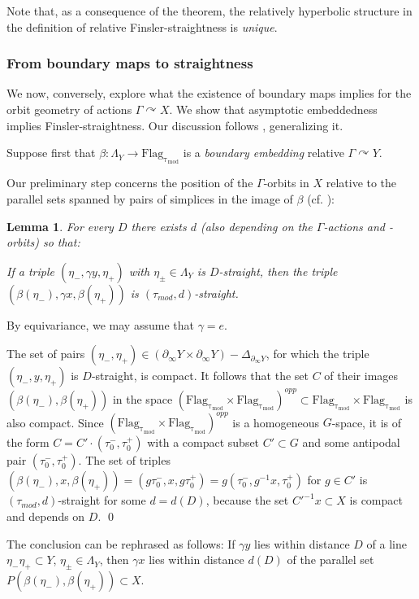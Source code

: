 \documentclass[12pt]{article}
\theoremstyle{boldplain}
\newtheorem{lem}[equation]{Lemma}
\theoremstyle{bolddefinition}
\numberwithin{equation}{section}
\def\ga{\gamma}
\def\Ga{\Gamma}
\def\De{\Delta}
\def\La{\Lambda}
\def\acts{\curvearrowright}
\def\Flagt{\operatorname{Flag_{\tau_{mod}}}}
\def\geo{\partial_{\infty}}
\def\LaY{\Lambda_Y}
\def\taumod{\tau_{mod}}
\begin{document}
\medskip
Note that, as a consequence of the theorem, 
the relatively hyperbolic structure in the definition of relative Finsler-straightness is {\em unique}.



\subsubsection{From boundary maps to straightness}
\label{sec:main}

We now, conversely, 
explore what the existence of boundary maps implies for the orbit geometry of actions $\Ga\acts X$.
We show that asymptotic embeddedness implies Finsler-straightness. 
Our discussion follows \cite[\S 5.3]{anolec}, generalizing it.

Suppose first that $\beta:\LaY\to\Flagt$ is a {\em boundary embedding} relative $\Ga\acts Y$.

Our preliminary step concerns the position of the $\Ga$-orbits in $X$ 
relative to the parallel sets spanned by pairs of simplices in the image of $\beta$
(cf. \cite[Lemma 5.3]{anolec}):
\begin{lem}
\label{lem:contrdstprst}
For every $D$ there exists $d$ (also depending on the $\Ga$-actions and -orbits) so that: 

If a triple $(\eta_-,\ga y,\eta_+)$ with $\eta_{\pm}\in\La_Y$ is $D$-straight, 
then the triple $(\beta(\eta_-),\ga x,\beta(\eta_+))$ is 
$(\taumod,d)$-straight.
\end{lem}
\proof 
By equivariance, we may assume that $\ga=e$.

The set of 
pairs $(\eta_-,\eta_+)\in (\geo Y\times \geo Y)-\De_{\geo Y}$,
for which the triple $(\eta_-,y,\eta_+)$ is $D$-straight, is compact.
It follows that the set $C$ of their images $(\beta(\eta_-),\beta(\eta_+))$ 
in the space $(\Flagt\times\Flagt)^{opp}\subset\Flagt\times\Flagt$ is also compact.
Since $(\Flagt\times\Flagt)^{opp}$ is a homogeneous $G$-space,
it is of the form $C=C'\cdot(\tau_0^-,\tau_0^+)$ with a compact subset $C'\subset G$ and some antipodal pair $(\tau_0^-,\tau_0^+)$. 
The set of triples 
$(\beta(\eta_-),x,\beta(\eta_+))=(g\tau_0^-,x,g\tau_0^+)=g(\tau_0^-,g^{-1}x,\tau_0^+)$ for $g\in C'$
is $(\taumod,d)$-straight for some $d=d(D)$,
because the set ${C'}^{-1}x\subset X$ is compact and depends on $D$.
\qed

\medskip
The conclusion can be rephrased as follows:
If $\ga y$ lies within distance $D$ of a line $\eta_-\eta_+\subset Y$, $\eta_{\pm}\in\LaY$,
then $\ga x$ lies within distance $d(D)$ of the parallel set $P(\beta(\eta_-),\beta(\eta_+))\subset X$.
\end{document}
